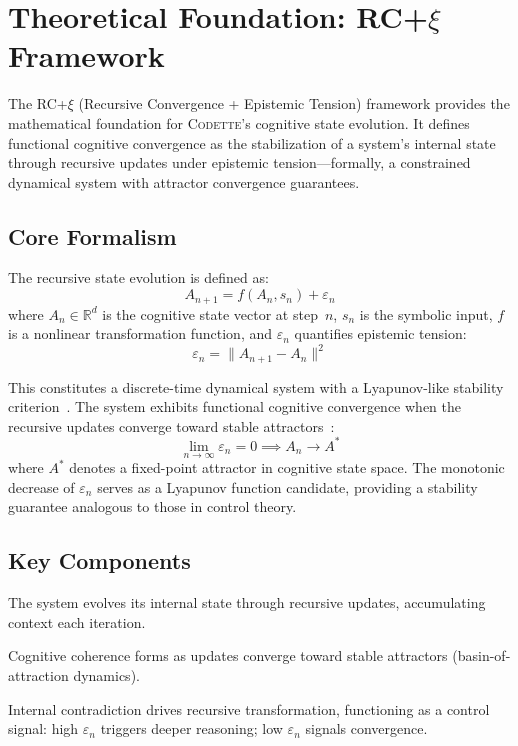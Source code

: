 \documentclass[11pt,a4paper]{article}
\newcommand{\rcxi}{RC+$\xi$}
\newcommand{\codette}{\textsc{Codette}}
\begin{document}
\section{Theoretical Foundation: \rcxi{} Framework}
\label{sec:theory}

The \rcxi{} (Recursive Convergence + Epistemic Tension) framework provides the mathematical foundation for \codette{}'s cognitive state evolution. It defines functional cognitive convergence as the stabilization of a system's internal state through recursive updates under epistemic tension---formally, a constrained dynamical system with attractor convergence guarantees.

\subsection{Core Formalism}
The recursive state evolution is defined as:
\begin{equation}
  A_{n+1} = f(A_n, s_n) + \varepsilon_n
  \label{eq:state_evolution}
\end{equation}
where $A_n \in \mathbb{R}^d$ is the cognitive state vector at step~$n$, $s_n$ is the symbolic input, $f$ is a nonlinear transformation function, and $\varepsilon_n$ quantifies epistemic tension:
\begin{equation}
  \varepsilon_n = \|A_{n+1} - A_n\|^2
  \label{eq:tension}
\end{equation}

This constitutes a discrete-time dynamical system with a Lyapunov-like stability criterion~\citep{khalil2002nonlinear}. The system exhibits functional cognitive convergence when the recursive updates converge toward stable attractors~\citep{strogatz2015nonlinear}:
\begin{equation}
  \lim_{n \to \infty} \varepsilon_n = 0 \implies A_n \to A^*
  \label{eq:convergence}
\end{equation}
where $A^*$ denotes a fixed-point attractor in cognitive state space. The monotonic decrease of $\varepsilon_n$ serves as a Lyapunov function candidate, providing a stability guarantee analogous to those in control theory.

\subsection{Key Components}
\begin{description}[leftmargin=*]
  \item[Recursion (R)] The system evolves its internal state through recursive updates, accumulating context each iteration.
  \item[Convergence (C$^+$)] Cognitive coherence forms as updates converge toward stable attractors (basin-of-attraction dynamics).
  \item[Epistemic Tension ($\xi$)] Internal contradiction drives recursive transformation, functioning as a control signal: high $\varepsilon_n$ triggers deeper reasoning; low $\varepsilon_n$ signals convergence.
\end{description}
\end{document}
